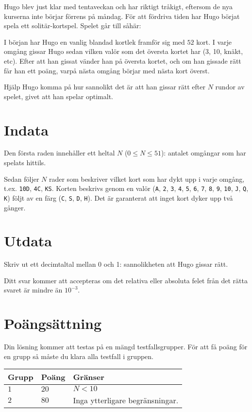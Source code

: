 Hugo blev just klar med tentaveckan och har riktigt tråkigt, eftersom de nya kurserna inte börjar förrens på måndag.
För att fördriva tiden har Hugo börjat spela ett solitär-kortspel. Spelet går till såhär:

I början har Hugo en vanlig blandad kortlek framför sig med $52$ kort. I varje omgång gissar Hugo sedan vilken valör som det översta kortet har (3, 10, knäkt, etc).
Efter att han gissat vänder han på översta kortet, och om han gissade rätt får han ett poäng, varpå nästa omgång börjar med nästa kort överst.

Hjälp Hugo komma på hur sannolikt det är att han gissar rätt efter $N$ rundor av spelet, givet att han spelar optimalt.

\section*{Indata}
Den första raden innehåller ett heltal $N$ ($0 \le N \le 51$): antalet omgångar som har spelats hittils.

Sedan följer $N$ rader som beskriver vilket kort som har dykt upp i varje omgång, t.ex. \texttt{10D}, \texttt{4C}, \texttt{KS}.
Korten beskrivs genom en valör (\texttt{A}, \texttt{2}, \texttt{3}, \texttt{4}, \texttt{5}, \texttt{6}, \texttt{7}, \texttt{8},
\texttt{9}, \texttt{10}, \texttt{J}, \texttt{Q}, \texttt{K}) följt av en färg (\texttt{C}, \texttt{S}, \texttt{D}, \texttt{H}).
Det är garanterat att inget kort dyker upp två gånger.

\section*{Utdata}
Skriv ut ett decimtaltal mellan 0 och 1: sannolikheten att Hugo gissar rätt.

Ditt svar kommer att accepteras om det relativa eller absoluta felet från det rätta svaret är mindre än $10^{-3}$.

\section*{Poängsättning}
Din lösning kommer att testas på en mängd testfallsgrupper.
För att få poäng för en grupp så måste du klara alla testfall i gruppen.

\noindent
\begin{tabular}{| l | l | p{12cm} |}
  \hline
  \textbf{Grupp} & \textbf{Poäng} & \textbf{Gränser} \\ \hline
  $1$    & $20$       & $N < 10$ \\ \hline
  $2$    & $80$       & Inga ytterligare begränsningar. \\ \hline
\end{tabular}
